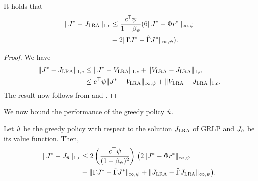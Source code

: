 \documentclass[12pt,draftcls,onecolumn]{IEEEtran}
\begin{document}
\begin{theorem}
\label{cmt2mn}
It holds that
\begin{align}\label{finalbndmn}
\begin{split}
\norm{J^*-\hj}_{1,c}
&\leq\frac{c^\top\psi}{1-\beta_\psi}(6 \norm{J^*-\Phi r^*}_{\mn}\\
&+2\norm{\Gamma J^*-\hg J^*}_{\mn}).
\end{split}
\end{align}
\end{theorem}
\begin{proof}
We have
\begin{align}
\|J^*-J_{\text{\sc LRA}}\|_{1,c}\nonumber
&\leq\|J^*-V_{\text{\sc LRA}}\|_{1,c}+\|V_{\text{\sc LRA}}-J_{\text{\sc LRA}}\|_{1,c}\nonumber\\
&\leq c^\top \psi \|J^*-V_{\text{\sc LRA}}\|_{\infty,\psi}+\|V_{\text{\sc LRA}}-J_{\text{\sc LRA}}\|_{1,c}.\nonumber
\end{align}
The result now follows from  and .
\end{proof}
\fi
{}
We now bound the performance of the greedy policy $\hat{u}$.
\begin{theorem}
\label{polthe}
Let $\hat{u}$ be the greedy policy with respect to the solution $J_{\text{\sc LRA}}$ of GRLP and $J_{\hat{u}}$ be its value function.
Then,
\begin{align}\label{polthebnd}
\norm{J^* - J_{\hu}}_{1,c}
&\leq 2\left(\frac{c^\top \psi}{(1-\beta_{\psi})^2}\right)\, \big( 2\norm{J^*-\Phi r^*}_{\mn}
\nn\\&
+\norm{\Gamma J^*-\hg J^*}_{\mn}+\norm{\hj-\hg\hj}_{\mn}\big).
\end{align}
\end{theorem}
\end{document}
